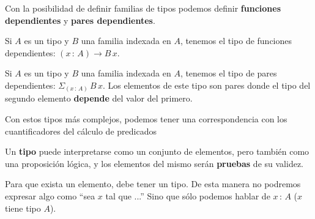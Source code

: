 \documentclass[xcolor=dvipsnames]{beamer} %
\newcommand{\tjud}[2]
  {\ensuremath{#1\,:\,#2}}
\newcommand{\depPair}[3]
 {\ensuremath{\Sigma_{(\tjud{#1}{#2})}\,#3\,#1}
 }
\begin{document}
\begin{frame}
 \begin{block}{}
  Con la posibilidad de definir familias de tipos podemos definir \textbf{funciones dependientes} y \textbf{pares dependientes}.
 \end{block}
 
 \pause
 
 \begin{block}{}
  Si $A$ es un tipo y $B$ una familia indexada en $A$, tenemos el tipo de funciones dependientes:
  $(\tjud{x}{A}) \rightarrow B\,x$.
 \end{block}
 
 \pause
 
 \begin{block}{}
  Si $A$ es un tipo y $B$ una familia indexada en $A$, tenemos el tipo de pares dependientes:
  $\depPair{x}{A}{B}$. Los elementos de este tipo son pares donde el tipo del segundo elemento \textbf{depende}
  del valor del primero.
 \end{block} 

 \pause
 
 \begin{block}{}
  Con estos tipos más complejos, podemos tener una correspondencia con los cuantificadores del cálculo
  de predicados
 \end{block}


\end{frame}



\begin{frame}

    \begin{block}{}
     Un \textbf{tipo} puede interpretarse como un conjunto de elementos, pero también como una proposición
     lógica, y los elementos del mismo serán \textbf{pruebas} de su validez.
    \end{block}
    
    \pause

    \begin{block}{}
     Para que exista un elemento, debe tener un tipo. De esta manera no podremos expresar algo como ``sea
     $x$ tal que ...'' Sino que sólo podemos hablar de $x\,:\,A$ ($x$ tiene tipo $A$).
    \end{block}
    

\end{frame}
\end{document}
